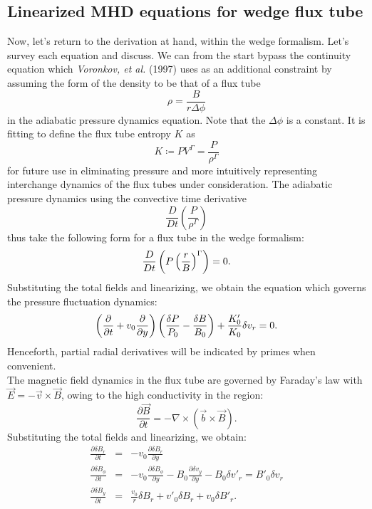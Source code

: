 \documentclass[a4paper,openany,12pt]{book}
\begin{document}
\subsection{Linearized MHD equations for wedge flux tube}

Now, let's return to the derivation at hand, within the wedge formalism. Let's survey each equation and discuss. We can from the start bypass the continuity equation which \emph{Voronkov, et al.} (1997) uses as an additional constraint by assuming the form of the density to be that of a flux tube
\begin{equation}
\rho=\frac{B}{r\Delta\phi}\label{E9.79}
\end{equation}
in the adiabatic pressure dynamics equation. Note that the $\Delta\phi$ is a constant. It is fitting to define the flux tube entropy $K$ as
\begin{equation}
K\coloneqq PV^\Gamma=\frac{P}{\rho^\Gamma}\label{E9.80}
\end{equation}
for future use in eliminating pressure and more intuitively representing interchange dynamics of the flux tubes under consideration. The adiabatic pressure dynamics using the convective time derivative
\begin{equation}
\frac{D}{Dt}\left(\frac{P}{\rho^\Gamma}\right)\label{E9.81}
\end{equation}
thus take the following form for a flux tube in the wedge formalism:
\begin{equation}
\frac{D}{Dt}\left(P\left({r\over B}\right)^\Gamma\right)=0.\label{E9.82}
\end{equation}
Substituting the total fields and linearizing, we obtain the equation which governs the pressure fluctuation dynamics:
\begin{equation}
\left({\partial\over\partial t}+v_0{\partial\over\partial y}\right)\left({\delta P\over P_0}-{\delta B\over B_0}\right)+{K'_0\over K_0}\delta v_r=0.\label{E9.83}
\end{equation}
Henceforth, partial radial derivatives will be indicated by primes when convenient.\\
\indent The magnetic field dynamics in the flux tube are governed by Faraday's law with $\vec E=-\vec v\times\vec B$, owing to the high conductivity in the region:
\begin{equation}
\frac{\partial\vec B}{\partial t}=-\nabla\times(\vec b\times\vec B).\label{E9.84}
\end{equation}
Substituting the total fields and linearizing, we obtain:
\begin{eqnarray}
\frac{\partial\delta B_r}{\partial t}&=&-v_0\frac{\partial\delta B_r}{\partial y}\label{E9.85}\\
\frac{\partial\delta B_\phi}{\partial t}&=&-v_{0}\frac{\partial\delta B_\phi}{\partial y}-B_0\frac{\partial\delta v_y}{\partial y}-B_0\delta v'_r=B'_0\delta v_r\label{E9.86}\\
\frac{\partial\delta B_y}{\partial t}&=&\frac{v_0}{r}\delta B_r+v'_0\delta B_r+v_0
\delta B'_r.\label{E9.87}
\end{eqnarray}
\end{document}
